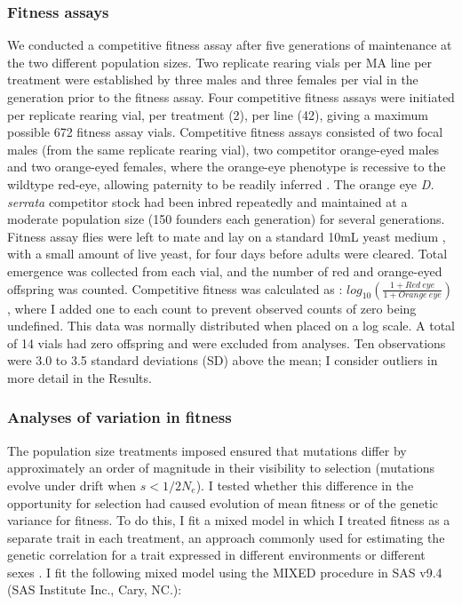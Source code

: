 \subsubsection{Fitness assays} 
We conducted a competitive fitness assay after five generations of maintenance at the two different population sizes. Two replicate rearing vials per MA line per treatment were established by three males and three females per vial in the generation prior to the fitness assay. Four competitive fitness assays were initiated per replicate rearing vial, per treatment (2), per line (42), giving a maximum possible 672 fitness assay vials. Competitive fitness assays consisted of two focal males (from the same replicate rearing vial), two competitor orange-eyed males and two orange-eyed females, where the orange-eye phenotype is recessive to the wildtype red-eye, allowing paternity to be readily inferred \citep{Alle17}. The orange eye \textit{D. serrata} competitor stock had been inbred repeatedly and maintained at a moderate population size (150 founders each generation) for several generations. Fitness assay flies were left to mate and lay on a standard 10mL yeast medium \citep{Rund05}, with a small amount of live yeast, for four days before adults were cleared. Total emergence was collected from each vial, and the number of red and orange-eyed offspring was counted. Competitive fitness was calculated as \citep{Alle17}: 
$log_{10}(\frac{1+Red\ eye}{1+Orange\ eye})$, where I added one to each count to prevent observed counts of zero being undefined. This data was normally distributed when placed on a log scale. A total of 14 vials had zero offspring and were excluded from analyses. Ten observations were 3.0 to 3.5 standard deviations (SD) above the mean; I consider outliers in more detail in the Results.\par

\subsubsection{Analyses of variation in fitness}
The population size treatments imposed ensured that mutations differ by approximately an order of magnitude in their visibility to selection (mutations evolve under drift when $s < 1/2N_e$). I tested whether this difference in the opportunity for selection had caused evolution of mean fitness or of the genetic variance for fitness. To do this, I fit a mixed model in which I treated fitness as a separate trait in each treatment, an approach commonly used for estimating the genetic correlation for a trait expressed in different environments \citep{Falc96} or different sexes \citep{Alle17}. I fit the following mixed model using the MIXED procedure in SAS v9.4 (SAS Institute Inc., Cary, NC.):

